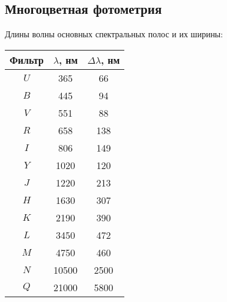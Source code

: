 \documentclass[12pt]{article}
\begin{document}
 \subsection*{Многоцветная фотометрия}
 Длины волны основных спектральных полос и их ширины:
\begin{center}	
	\begin{tabular}[h]{|c|c|c|}
		\hline
		Фильтр& $\lambda$, нм&  $\Delta \lambda$, нм\\
		\hline
		$U$ & 365& 66\\
		$B$ & 445 & 94\\
		$V$ & 551 & 88\\
		$R$ & 658 & 138\\
		$I$ & 806 & 149\\
		$Y$ & 1020 & 120\\
		$J$ & 1220 & 213\\
		$H$ & 1630 & 307\\
		$K$ & 2190 & 390\\
		$L$ & 3450 & 472\\
		$M$ & 4750 & 460\\
		$N$ & 10500 & 2500\\
		$Q$ & 21000 & 5800\\
		\hline
	\end{tabular}
\end{center}
\end{document}
